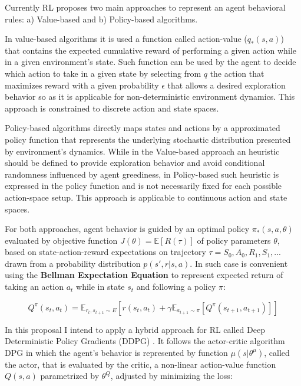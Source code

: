 \documentclass[peerreview]{IEEEtran}
\begin{document}
 Currently RL proposes two main approaches to represent an agent behavioral rules: a) Value-based and b) Policy-based algorithms. 
 
 In value-based algorithms it is used a function called action-value ($q_*(s,a)$) that contains the expected cumulative reward of performing a given action while in a given environment's state. Such function can be used by the agent to decide which action to take in a given state by selecting from $q$ the action that maximizes reward with a given probability $\epsilon$ that allows a desired exploration behavior so as it is applicable for non-deterministic environment dynamics. This approach is constrained to discrete action and state spaces.
 
 Policy-based algorithms directly maps states and actions by a approximated policy function that represents the underlying stochastic distribution presented by environment's dynamics. While in the Value-based approach an heuristic should be defined to provide exploration behavior and avoid conditional randomness influenced by agent greediness, in Policy-based such heuristic is expressed in the policy function and is not necessarily fixed for each possible action-space setup. This approach is applicable to continuous action and state spaces.
 
 For both approaches, agent behavior is guided by an optimal policy $\pi_*(s, a, \theta)$ evaluated by objective function $J(\theta)=\mathbb{E}[R(\tau)]$ of policy parameters $\theta$, based on state-action-reward expectations on trajectory $\tau=S_0, A_0, R_1, S_1, ... $ drawn from a probability distribution \textbf{$p(s',r|s, a)$}. In such case is convenient using the \textbf{Bellman Expectation Equation} \cite{bellman_equation} to represent expected return of taking an action $a_t$ while in state $s_t$ and following a policy $\pi$:  
 
 \begin{equation}
 	Q^\pi(s_t, a_t) = \mathbb{E}_{r_t, s_{t+1} \sim E} [r(s_t, a_t) + \gamma\mathbb{E}_{a_{t+1} \sim \pi} [Q^\pi(s_{t+1}, a_{t+1})]]
 \end{equation}
 
 In this proposal I intend to apply a hybrid approach for RL called Deep Deterministic Policy Gradients (DDPG) \cite{ddpg_2015}. It follows the actor-critic \cite{actor_critic_2000} algorithm DPG \cite{silver_2004} in which the agent's behavior is represented by function $\mu(s|\theta^\mu)$, called the actor, that is evaluated by the critic, a non-linear action-value function $Q(s,a)$ parametrized by $\theta^Q$, adjusted by minimizing the loss:
 
\end{document}
